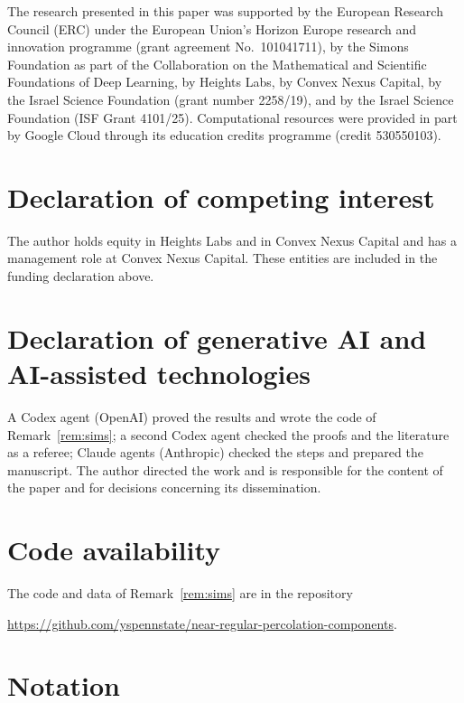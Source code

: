 \documentclass[11pt]{amsart}
\theoremstyle{remark}
\begin{document}
The research presented in this paper was supported by the European Research Council (ERC) under the European Union's
Horizon Europe research and innovation programme (grant agreement No.~101041711), by the Simons Foundation as part of
the Collaboration on the Mathematical and Scientific Foundations of Deep Learning, by Heights Labs, by Convex Nexus
Capital, by the Israel Science Foundation (grant number 2258/19), and by the Israel Science Foundation (ISF Grant
4101/25). Computational resources were provided in part by Google Cloud through its education credits programme (credit
530550103).

\section*{Declaration of competing interest}
The author holds equity in Heights Labs and in Convex Nexus Capital and has a management role at Convex Nexus Capital.
These entities are included in the funding declaration above.

\section*{Declaration of generative AI and AI-assisted technologies}
A Codex agent (OpenAI) proved the results and wrote the code of Remark~\ref{rem:sims}; a second Codex agent checked the
proofs and the literature as a referee; Claude agents (Anthropic) checked the steps and prepared the manuscript. The
author directed the work and is responsible for the content of the paper and for decisions concerning its
dissemination.

\section*{Code availability}
The code and data of Remark~\ref{rem:sims} are in the repository
\begin{center}\url{https://github.com/yspennstate/near-regular-percolation-components}.\end{center}

\appendix
\section{Notation}\label{app:notation}
\end{document}
